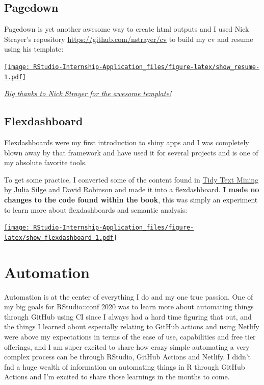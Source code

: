 \documentclass[
]{book}
\begin{document}
\hypertarget{pagedown}{%
\subsection{Pagedown}\label{pagedown}}

Pagedown\citep{R-pagedown} is yet another awesome way to create html outputs and I used Nick Strayer's repository \url{https://github.com/nstrayer/cv} to build my cv and resume using his template:

\href{https://ricky-cv.netlify.com/resume}{\texttt{[image: RStudio-Internship-Application\_files/figure-latex/show\_resume-1.pdf]}}

\emph{\href{https://github.com/nstrayer/cv}{Big thanks to Nick Strayer for the awesome template!}}

\hypertarget{flexdashboard}{%
\subsection{Flexdashboard}\label{flexdashboard}}

Flexdashboards \citep{R-flexdashboard} were my first introduction to shiny apps and I was completely blown away by that framework and have used it for several projects and is one of my absolute favorite tools.

To get some practice, I converted some of the content found in \href{https://www.tidytextmining.com/}{Tidy Text Mining by Julia Silge and David Robinson} and made it into a flexdashboard. \textbf{I made no changes to the code found within the book}, this was simply an experiment to learn more about flexdashboards and semantic analysis:

\href{https://predictcrypto.shinyapps.io/SemanticAnalysisExample/}{\texttt{[image: RStudio-Internship-Application\_files/figure-latex/show\_flexdashboard-1.pdf]}}

\hypertarget{automation}{%
\section{Automation}\label{automation}}

Automation is at the center of everything I do and my one true passion. One of my big goals for RStudio::conf 2020 was to learn more about automating things through GitHub using CI since I always had a hard time figuring that out, and the things I learned about especially relating to GitHub actions and using Netlify were above my expectations in terms of the ease of use, capabilities and free tier offerings, and I am super excited to share how crazy simple automating a very complex process can be through RStudio, GitHub Actions and Netlify. I didn't fnd a huge wealth of information on automating things in R through GitHub Actions and I'm excited to share those learnings in the months to come.
\end{document}
